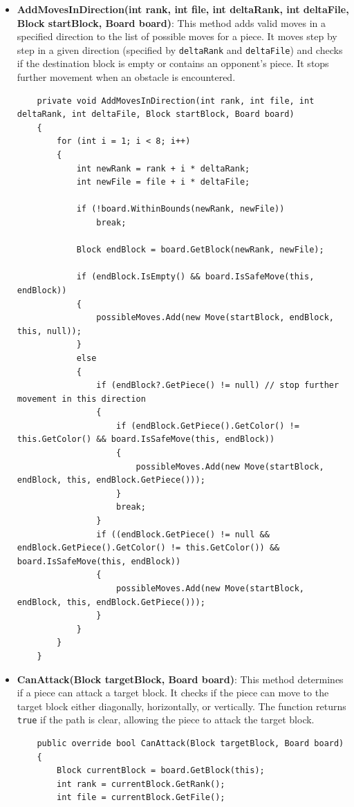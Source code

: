 \documentclass[a4paper,12pt]{article}
\begin{document}
\begin{itemize}
    \item \textbf{AddMovesInDirection(int rank, int file, int deltaRank, int deltaFile, Block startBlock, Board board)}:
    This method adds valid moves in a specified direction to the list of possible moves for a piece. It moves step by step in a given direction (specified by \texttt{deltaRank} and \texttt{deltaFile}) and checks if the destination block is empty or contains an opponent's piece. It stops further movement when an obstacle is encountered.

    \begin{verbatim}
    private void AddMovesInDirection(int rank, int file, int deltaRank, int deltaFile, Block startBlock, Board board)
    {
        for (int i = 1; i < 8; i++)
        {
            int newRank = rank + i * deltaRank;
            int newFile = file + i * deltaFile;

            if (!board.WithinBounds(newRank, newFile))
                break;

            Block endBlock = board.GetBlock(newRank, newFile);

            if (endBlock.IsEmpty() && board.IsSafeMove(this, endBlock))
            {
                possibleMoves.Add(new Move(startBlock, endBlock, this, null));
            }
            else
            {
                if (endBlock?.GetPiece() != null) // stop further movement in this direction
                {
                    if (endBlock.GetPiece().GetColor() != this.GetColor() && board.IsSafeMove(this, endBlock))
                    {
                        possibleMoves.Add(new Move(startBlock, endBlock, this, endBlock.GetPiece()));
                    }
                    break;
                }
                if ((endBlock.GetPiece() != null && endBlock.GetPiece().GetColor() != this.GetColor()) && board.IsSafeMove(this, endBlock))
                {
                    possibleMoves.Add(new Move(startBlock, endBlock, this, endBlock.GetPiece()));
                }
            }
        }
    }
    \end{verbatim}

    \item \textbf{CanAttack(Block targetBlock, Board board)}:
    This method determines if a piece can attack a target block. It checks if the piece can move to the target block either diagonally, horizontally, or vertically. The function returns \texttt{true} if the path is clear, allowing the piece to attack the target block.

    \begin{verbatim}
    public override bool CanAttack(Block targetBlock, Board board)
    {
        Block currentBlock = board.GetBlock(this);
        int rank = currentBlock.GetRank();
        int file = currentBlock.GetFile();


\end{verbatim}
\end{itemize}
\end{document}
